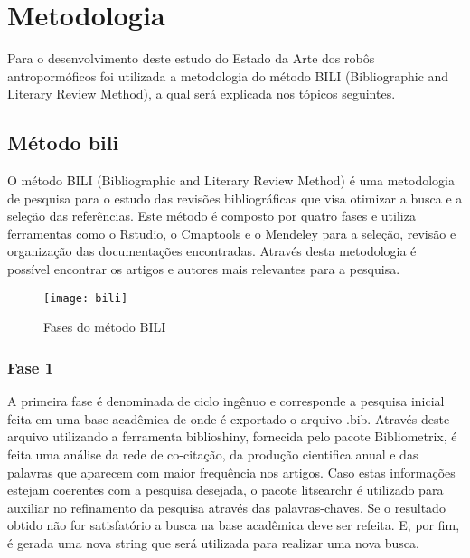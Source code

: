 

\chapter{Metodologia}
\label{chap:metod}

Para o desenvolvimento deste estudo do Estado da Arte dos robôs antropormóficos foi utilizada a metodologia do método BILI (Bibliographic and Literary Review Method), a qual será explicada nos tópicos seguintes.

\section{Método bili}
\label{sec:bili}

O método BILI (Bibliographic and Literary Review Method) é uma metodologia de pesquisa para o estudo das revisões bibliográficas que visa otimizar a busca e a seleção das referências. Este método é composto por quatro fases e utiliza  ferramentas como o  Rstudio, o Cmaptools e o Mendeley para a seleção, revisão e organização das documentações encontradas. Através desta metodologia é possível encontrar os artigos e autores mais relevantes para a pesquisa.

\begin{figure} [H]	
    \centering
    \caption{Fases do método BILI}
    \texttt{[image: bili]}
    \label{fig:bili}
\end{figure}

\subsection{Fase 1}
\label{sec:fase1}

A primeira fase é denominada de ciclo ingênuo e corresponde a pesquisa inicial feita em uma base acadêmica  de onde é exportado o arquivo .bib. Através deste arquivo utilizando a ferramenta biblioshiny, fornecida pelo pacote Bibliometrix, é feita uma análise da rede de co-citação, da produção cientifica anual e das palavras que aparecem com maior frequência nos artigos. Caso estas informações estejam coerentes com a pesquisa desejada, o pacote litsearchr é utilizado para auxiliar no refinamento da pesquisa através das palavras-chaves. Se o resultado obtido não for satisfatório a busca na base acadêmica deve ser refeita. E, por fim, é gerada uma nova string que será utilizada para realizar uma nova busca. 



